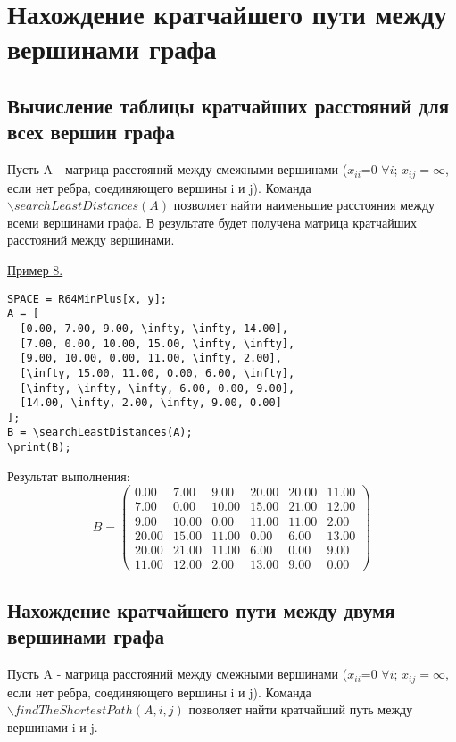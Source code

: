 \section{Нахождение кратчайшего пути между вершинами графа}
\subsection{Вычисление таблицы кратчайших расстояний для всех вершин графа}
Пусть A - матрица расстояний между смежными вершинами ($x_{ii}$=0 $\forall i$; $x_{ij}=\infty$, если нет ребра, соединяющего вершины i и j).
Команда $\backslash searchLeastDistances(A)$ позволяет найти наименьшие расстояния между всеми вершинами графа.
В результате будет получена матрица  кратчайших расстояний между вершинами. 

\smallskip

\underline{Пример 8. }

\vspace*{-3mm}
\begin{verbatim}
SPACE = R64MinPlus[x, y];
A = [
  [0.00, 7.00, 9.00, \infty, \infty, 14.00],
  [7.00, 0.00, 10.00, 15.00, \infty, \infty],
  [9.00, 10.00, 0.00, 11.00, \infty, 2.00],
  [\infty, 15.00, 11.00, 0.00, 6.00, \infty],
  [\infty, \infty, \infty, 6.00, 0.00, 9.00],
  [14.00, \infty, 2.00, \infty, 9.00, 0.00]
];
B = \searchLeastDistances(A);
\print(B);
\end{verbatim}

Результат выполнения:\\
$$B= \left(\begin{array}{cccccc}
0.00 & 7.00 & 9.00 & 20.00 & 20.00 & 11.00\\
7.00 & 0.00 & 10.00 & 15.00 & 21.00 & 12.00\\
9.00 & 10.00 & 0.00 & 11.00 & 11.00 & 2.00\\
20.00 & 15.00 & 11.00 & 0.00 & 6.00 & 13.00\\
20.00 & 21.00 & 11.00 & 6.00 & 0.00 & 9.00\\
11.00 & 12.00 & 2.00 & 13.00 & 9.00 & 0.00
\end{array}\right) $$
\subsection{Нахождение кратчайшего пути между двумя вершинами графа}
Пусть A - матрица расстояний между смежными вершинами ($x_{ii}$=0 $\forall i$; $x_{ij}=\infty$, если нет ребра, соединяющего вершины i и j).
Команда $\backslash findTheShortestPath(A, i, j)$ позволяет найти кратчайший путь между вершинами i и j.
\smallskip

